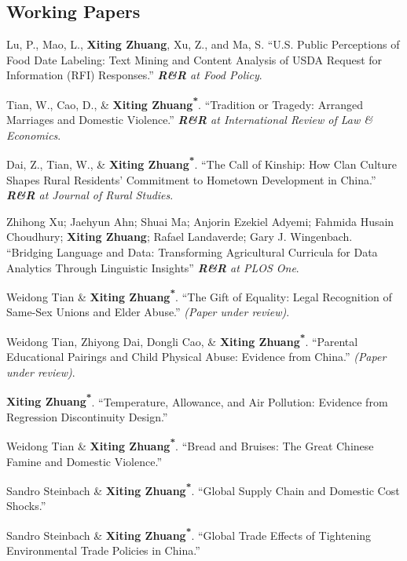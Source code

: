 \documentclass[10.5pt,letterpaper]{article}
\newcommand{\corrauthor}{\textsuperscript{*}}
\renewenvironment{itemize}{
	\begin{list}{}{
			\setlength{\leftmargin}{1.5em}
		}
	}{
	\end{list}
}
\begin{document}
	\subsection*{\textbf{Working Papers}}
	\begin{itemize}
		
		\item[-] Lu, P., Mao, L., \textbf{Xiting Zhuang}, Xu, Z., and Ma, S.  
		``U.S. Public Perceptions of Food Date Labeling: Text Mining and Content Analysis of USDA Request for Information (RFI) Responses.''  
		\emph{\textbf{R\&R} at \textit{Food Policy}}.
		
		\item[-] Tian, W., Cao, D., \& \textbf{Xiting Zhuang\corrauthor}.  
		``Tradition or Tragedy: Arranged Marriages and Domestic Violence.''  
		\emph{\textbf{R\&R} at \textit{International Review of Law \& Economics}}.
		
		\item[-] Dai, Z., Tian, W., \& \textbf{Xiting Zhuang\corrauthor}.  
		``The Call of Kinship: How Clan Culture Shapes Rural Residents’ Commitment to Hometown Development in China.''  
		\emph{\textbf{R\&R} at \textit{Journal of Rural Studies}}.
		
		
		
		\item[-]  Zhihong Xu; Jaehyun Ahn; Shuai Ma; Anjorin Ezekiel Adyemi; Fahmida Husain Choudhury;  \textbf{Xiting Zhuang}; Rafael Landaverde; Gary J. Wingenbach. ``Bridging Language and Data: Transforming Agricultural Curricula for Data Analytics Through Linguistic Insights'' 
				\emph{\textbf{R\&R} at \textit{PLOS One}}.
		
		
		
		
		\item[-] Weidong Tian \& \textbf{Xiting Zhuang\corrauthor}.  
		``The Gift of Equality: Legal Recognition of Same-Sex Unions and Elder Abuse.''  
		\textit{(Paper under review)}.
		
		
		
		\item[-] Weidong Tian, Zhiyong Dai, Dongli Cao, \& \textbf{Xiting Zhuang\corrauthor}.  
		``Parental Educational Pairings and Child Physical Abuse: Evidence from China.''  
		\textit{(Paper under review)}.
		
		
		
		\item[-] \textbf{Xiting Zhuang\corrauthor}.  
		``Temperature, Allowance, and Air Pollution: Evidence from Regression Discontinuity Design.''
		
		
		
		\item[-] Weidong Tian \& \textbf{Xiting Zhuang\corrauthor}.  
		``Bread and Bruises: The Great Chinese Famine and Domestic Violence.''
		
		\item[-] Sandro Steinbach \& \textbf{Xiting Zhuang\corrauthor}.  
		``Global Supply Chain and Domestic Cost Shocks.''
		
		\item[-] Sandro Steinbach \& \textbf{Xiting Zhuang\corrauthor}.  
		``Global Trade Effects of Tightening Environmental Trade Policies in China.''
	\end{itemize}
\end{document}
